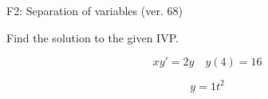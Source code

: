 \begin{exercise}
  \begin{exerciseTitle}F2: Separation of variables (ver. 68)\end{exerciseTitle}
  \begin{exerciseStatement}
    
Find the solution to the given IVP.

    
\[xy'= 2 y \hspace{1em} y( 4 ) = 16\]

  \end{exerciseStatement}
  \begin{exerciseAnswer}
    
\[y= 1 t^ 2\]

  \end{exerciseAnswer}
\end{exercise}